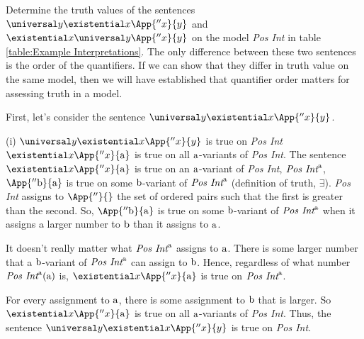 \begin{majorILnc}{}
Determine the truth values of the sentences $\universal\variable{y}\existential\variable{x}\App{''\variable{x}}{\variable{y}}$ and $\existential\variable{x}\universal\variable{y}\App{''\variable{x}}{\variable{y}}$ on the model \emph{Pos Int} in table \ref{table:Example Interpretations}.  The only difference between these two sentences is the order of the quantifiers.  If we can show that they differ in truth value on the same model, then we will have established that quantifier order matters for assessing truth in a model.
\end{majorILnc}
\begin{PROOF}
First, let's consider the sentence $\universal\variable{y}\existential\variable{x}\App{''\variable{x}}{\variable{y}}$.

(i)  $\universal\variable{y}\existential\variable{x}\App{''\variable{x}}{\variable{y}}$ is true on \emph{Pos Int} \Iff $\existential\variable{x}\App{''\variable{x}}{\constant{a}}$ is true on all $\mathrm{a}$-variants of \emph{Pos Int}.  The sentence $\existential\variable{x}\App{''\variable{x}}{\constant{a}}$ is true on an $\mathrm{a}$-variant of \emph{Pos Int}, $\emph{Pos Int}^{\mathrm{a}}$, \Iff $\App{''\constant{b}}{\constant{a}}$ is true on some $\mathrm{b}$-variant of $\emph{Pos Int}^{\mathrm{a}}$ (definition of truth, $\exists$).  \emph{Pos Int} assigns to $\App{''}{}$ the set of ordered pairs such that the first is greater than the second.  So, $\App{''\constant{b}}{\constant{a}}$ is true on some $\mathrm{b}$-variant of $\emph{Pos Int}^{\mathrm{a}}$ when it assigns a larger number to $\mathrm{b}$ than it assigns to $\mathrm{a}$.

It doesn't really matter what $\emph{Pos Int}^{\mathrm{a}}$ assigns to $\mathrm{a}$.  There is some larger number that a $\mathrm{b}$-variant of $\emph{Pos Int}^{\mathrm{a}}$ can assign to $\mathrm{b}$.  Hence, regardless of what number $\emph{Pos Int}^{\mathrm{a}}(\mathrm{a})$ is, $\existential\variable{x}\App{''\variable{x}}{\constant{a}}$ is true on $\emph{Pos Int}^{\mathrm{a}}$.

For every assignment to $\mathrm{a}$, there is some assignment to $\mathrm{b}$ that is larger.  So $\existential\variable{x}\App{''\variable{x}}{\constant{a}}$ is true on all $\mathrm{a}$-variants of \emph{Pos Int}.  Thus, the sentence $\universal\variable{y}\existential\variable{x}\App{''\variable{x}}{\variable{y}}$ is true on \emph{Pos Int}.


\end{PROOF}
